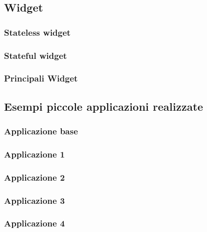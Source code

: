 \subsection{Widget}
\label{sec:Widget}

\subsubsection{Stateless widget}

\subsubsection{Stateful widget}

\subsubsection{Principali Widget}

\subsection{Esempi piccole applicazioni realizzate}

\subsubsection{Applicazione base}

\subsubsection{Applicazione 1}

\subsubsection{Applicazione 2}

\subsubsection{Applicazione 3}

\subsubsection{Applicazione 4}





